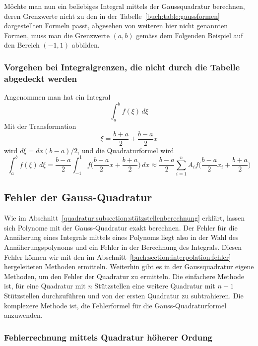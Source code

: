 Möchte man nun ein beliebiges Integral mittels der Gaussquadratur berechnen,
deren Grenzwerte nicht zu den in der Tabelle~\ref{buch:table:gaussformen} 
dargestellten Formeln passt, 
abgesehen von weiteren hier nicht genannten Formen, 
muss man die Grenzwerte $(a, b)$ gemäss dem Folgenden Beispiel
auf den Bereich $(-1, 1)$ abbilden.

\subsubsection{Vorgehen bei Integralgrenzen, die nicht durch die Tabelle abgedeckt werden}

Angenommen man hat ein Integral
\begin{equation}
    \int_{a}^{b}f(\xi)\,d\xi
\end{equation}
Mit der Transformation
\begin{equation}
    \xi = \frac{b + a}{2} + \frac{b - a}{2} x    
\end{equation}
wird $d\xi = dx(b - a)/2$, und die Quadraturformel wird
\begin{equation}
    \int_{a}^{b}f(\xi)\,d\xi 
    =
    \frac{b - a}{2} \int_{-1}^{1}f\bigg(\frac{b - a}{2}x + \frac{b + a}{2}\bigg)\, dx 
    \approx
     \frac{b - a}{2} \sum_{i=1}^{n} A_{i}f\bigg(\frac{b - a}{2}x_{i} + \frac{b + a}{2}\bigg)
\end{equation}

\subsection{Fehler der Gauss-Quadratur
\label{quadratur:subsection:gaussfehler}}
Wie im Abschnitt~\ref{quadratur:subsection:stützstellenberechnung} erklärt,
lassen sich Polynome mit der Gauss-Quadratur exakt berechnen. 
Der Fehler für die Annäherung eines Integrals mittels eines Polynoms liegt
also in der Wahl des Annäherungspolynoms und ein Fehler in der Berechnung des Integrals.
Diesen Fehler können wir mit den im Abschnitt~\ref{buch:section:interpolation:fehler}
hergeleiteten Methoden ermitteln.
Weiterhin gibt es in der Gaussquadratur eigene Methoden, 
um den Fehler der Quadratur zu ermitteln. 
Die einfachere Methode ist, für eine Quadratur mit $n$ Stützstellen eine weitere
Quadratur mit $n+1$ Stützstellen durchzuführen und von der ersten Quadratur zu
subtrahieren. Die komplexere Methode ist, 
die Fehlerformel für die Gauss-Quadraturformel anzuwenden. 

\subsubsection{Fehlerrechnung mittels Quadratur höherer Ordung}

